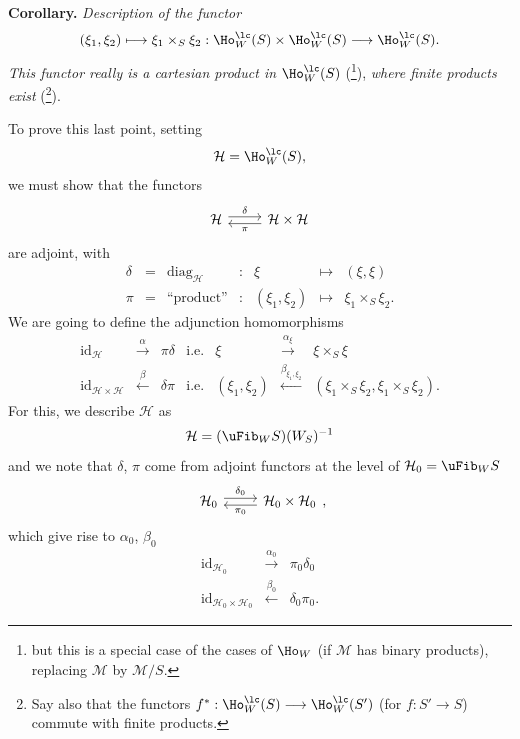 \setcounter{footnote}{131}



\textbf{Corollary.} {\itshape Description of the functor
\[
(\xi_1,\xi_2)\longmapsto\xi_1\times_S\xi_2 : \Ho^{\lc}_W(S)\times\Ho^{\lc}_W(S)\longrightarrow\Ho^{\lc}_W(S).
\]
This functor really is a cartesian product in} $\Ho^{\lc}_W(S)$ (\footnote{but this is a special case of the cases of $\Ho_W$ (if $\mathcal{M}$ has binary products), replacing $\mathcal{M}$ by $\mathcal{M}/S$.}), {\itshape where finite products exist} (\footnote{Say also that the functors $f^* : \Ho^{\lc}_W(S)\longrightarrow\Ho^{\lc}_W(S')$ (for $f : S'\longrightarrow S$) commute with finite products.}).

To prove this last point, setting
\[
\mathcal{H}=\Ho^{\lc}_W(S),
\]
we must show that the functors
\[
\begin{tikzcd}[ampersand replacement=\&]
\mathcal{H} \arrow[r, shift left, "\delta"] \& \mathcal{H}\times\mathcal{H} \arrow[l, shift left, "\pi"]
\end{tikzcd}
\]
are adjoint, with
\[
\begin{array}{rclcrcl}
\delta & = & \mathrm{diag}_{\mathcal{H}} & : & \xi & \longmapsto & (\xi,\xi)\\
\pi & = & \text{``product''} & : & (\xi_1,\xi_2) & \longmapsto & \xi_1\times_S\xi_2.
\end{array}
\]
We are going to define the adjunction homomorphisms
\[
\begin{array}{rcllrcl}
\mathrm{id}_{\mathcal{H}} & \xrightarrow{\alpha} & \pi\delta & \text{i.e.} & \xi & \xrightarrow{\alpha_\xi} & \xi\times_S\xi\\
\mathrm{id}_{\mathcal{H}\times\mathcal{H}} & \xleftarrow{\beta} & \delta\pi & \text{i.e.} & (\xi_1,\xi_2) & \xleftarrow{\beta_{\xi_1,\xi_2}} & (\xi_1\times_S\xi_2,\xi_1\times_S\xi_2).
\end{array}
\]
For this, we describe $\mathcal{H}$ as
\[
\mathcal{H}=(\uFib_W S)(W_S)^{-1}
\]
and we note that $\delta$, $\pi$ come from adjoint functors at the level of $\mathcal{H}_0=\uFib_W S$
\[
\begin{tikzcd}[ampersand replacement=\&]
\mathcal{H}_0 \arrow[r, shift left, "\delta_0"] \& \mathcal{H}_0\times\mathcal{H}_0 \arrow[l, shift left, "\pi_0"]
\end{tikzcd},
\]
which give rise to $\alpha_0$, $\beta_0$
\[
\begin{array}{rcl}
\mathrm{id}_{\mathcal{H}_0} & \xrightarrow{\alpha_0} & \pi_0\delta_0\\
\mathrm{id}_{\mathcal{H}_0\times\mathcal{H}_0} & \xleftarrow{\beta_0} & \delta_0\pi_0.
\end{array}
\]

